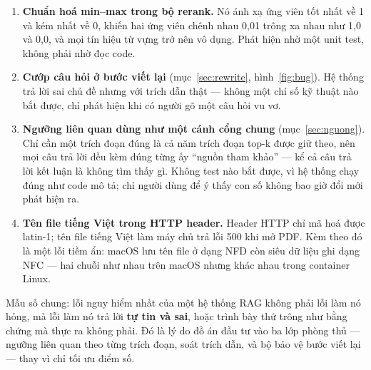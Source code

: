 \begin{enumerate}
  \item \textbf{Chuẩn hoá min–max trong bộ rerank.} Nó ánh xạ ứng viên tốt nhất về 1 và kém
  nhất về 0, khiến hai ứng viên chênh nhau 0,01 trông xa nhau như 1,0 và 0,0, và mọi tín hiệu
  từ vựng trở nên vô dụng. Phát hiện nhờ một unit test, không phải nhờ đọc code.
  \item \textbf{Cướp câu hỏi ở bước viết lại} (mục~\ref{sec:rewrite}, hình~\ref{fig:bug}). Hệ
  thống trả lời sai chủ đề nhưng với trích dẫn thật — không một chỉ số kỹ thuật nào bắt được,
  chỉ phát hiện khi có người gõ một câu hỏi vu vơ.
  \item \textbf{Ngưỡng liên quan dùng như một cánh cổng chung} (mục~\ref{sec:nguong}). Chỉ cần
  một trích đoạn đúng là cả năm trích đoạn top-k được giữ theo, nên mọi câu trả lời đều kèm
  đúng từng ấy “nguồn tham khảo” — kể cả câu trả lời kết luận là không tìm thấy gì. Không test
  nào bắt được, vì hệ thống chạy đúng như code mô tả; chỉ người dùng để ý thấy con số không bao
  giờ đổi mới phát hiện ra.
  \item \textbf{Tên file tiếng Việt trong HTTP header.} Header HTTP chỉ mã hoá được latin-1;
  tên file tiếng Việt làm máy chủ trả lỗi 500 khi mở PDF. Kèm theo đó là một lỗi tiềm ẩn: macOS
  lưu tên file ở dạng NFD còn siêu dữ liệu ghi dạng NFC — hai chuỗi như nhau trên macOS nhưng
  khác nhau trong container Linux.
\end{enumerate}

Mẫu số chung: lỗi nguy hiểm nhất của một hệ thống RAG không phải lỗi làm nó hỏng, mà lỗi làm nó
trả lời \textbf{tự tin và sai}, hoặc trình bày thứ trông như bằng chứng mà thực ra không phải.
Đó là lý do đồ án đầu tư vào ba lớp phòng thủ — ngưỡng liên quan theo từng trích đoạn, soát
trích dẫn, và bộ bảo vệ bước viết lại — thay vì chỉ tối ưu điểm số.

\chapterbreak
